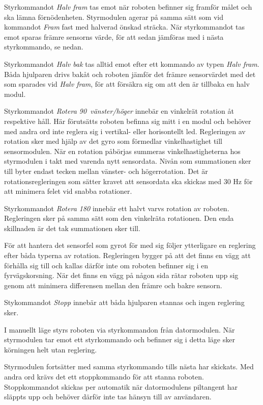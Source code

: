 \documentclass[11pt]{article}
\begin{document}
\begin{flushleft}
\begin{description}[style=unboxed, leftmargin=0cm]
Styrkommandot \textit{Halv fram} tas emot när roboten befinner sig framför målet och ska lämna förnödenheten. Styrmodulen agerar på samma sätt som vid kommandot \textit{Fram} fast med halverad önskad sträcka. När styrkommandot tas emot sparas främre sensorns värde, för att sedan jämföras med i nästa styrkommando, se nedan.

Styrkommandot \textit{Halv bak} tas alltid emot efter ett kommando av typen \textit{Halv fram}. Båda hjulparen drivs bakåt och roboten jämför det främre sensorvärdet med det som sparades vid \textit{Halv fram}, för att försäkra sig om att den är tillbaka en halv modul. 

Styrkommandot \textit{Rotera 90\textdegree\ vänster/höger} innebär en vinkelrät rotation åt respektive håll. Här förutsätts roboten befinna sig mitt i en modul och behöver med andra ord inte reglera sig i vertikal- eller horisontellt led. Regleringen av rotation sker med hjälp av det gyro som förmedlar vinkelhastighet till sensormodulen. När en rotation påbörjas summeras vinkelhastigheterna hos styrmodulen i takt med varenda nytt sensordata. Nivån som summationen sker till byter endast tecken mellan vänster- och högerrotation. Det är rotationsregleringen som sätter kravet att sensordata ska skickas med $30$ Hz för att minimera felet vid snabba rotationer. 

Styrkommandot \textit{Rotera 180\textdegree} innebär ett halvt varvs rotation av roboten. Regleringen sker på samma sätt som den vinkelräta rotationen. Den enda skillnaden är det tak summationen sker till. 

För att hantera det sensorfel som gyrot för med sig följer ytterligare en reglering efter båda typerna av rotation. Regleringen bygger på att det finns en vägg att förhålla sig till och kallas därför inte om roboten befinner sig i en fyrvägskorsning. När det finns en vägg på någon sida rätar roboten upp sig genom att minimera differensen mellan den främre och bakre sensorn. 

Stykommandot \textit{Stopp} innebär att båda hjulparen stannas och ingen reglering sker. 

\item[Manuellt läge] I manuellt läge styrs roboten via styrkommandon från datormodulen. När styrmodulen tar emot ett styrkommando och befinner sig i detta läge sker körningen helt utan reglering. 

Styrmodulen fortsätter med samma styrkommando tills nästa har skickats. Med andra ord krävs det ett stoppkommando för att stanna roboten. Stoppkommandot skickas per automatik när datormodulens piltangent har släppts upp och behöver därför inte tas hänsyn till av användaren. 


\end{description}
\end{flushleft}
\end{document}
